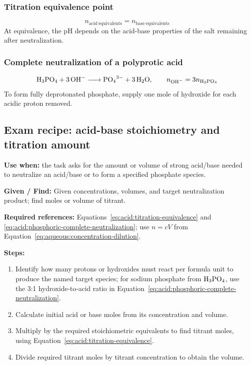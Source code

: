 \subsubsection{Titration equivalence point}
\begin{equation}
n_{\mathrm{acid\ equivalents}}=n_{\mathrm{base\ equivalents}}
\label{eq:acid:titration-equivalence}
\end{equation}
At equivalence, the pH depends on the acid-base properties of the salt remaining after neutralization.

\subsubsection{Complete neutralization of a polyprotic acid}
\begin{equation}
\ce{H3PO4 + 3OH- -> PO4^3- + 3H2O}, \qquad
n_{\ce{OH-}}=3n_{\ce{H3PO4}}
\label{eq:acid:phosphoric-complete-neutralization}
\end{equation}
To form fully deprotonated phosphate, supply one mole of hydroxide for each acidic proton removed.

\subsection{Exam recipe: acid-base stoichiometry and titration amount}
\textbf{Use when:} the task asks for the amount or volume of strong acid/base needed to neutralize an acid/base or to form a specified phosphate species.

\textbf{Given / Find:} Given concentrations, volumes, and target neutralization product; find moles or volume of titrant.

\textbf{Required references:} Equations~\eqref{eq:acid:titration-equivalence} and \eqref{eq:acid:phosphoric-complete-neutralization}; use \(n=cV\) from Equation~\eqref{eq:aqueous:concentration-dilution}.

\textbf{Steps:}
\begin{enumerate}
    \item Identify how many protons or hydroxides must react per formula unit to produce the named target species; for sodium phosphate from \(\ce{H3PO4}\), use the 3:1 hydroxide-to-acid ratio in Equation~\eqref{eq:acid:phosphoric-complete-neutralization}.
    \item Calculate initial acid or base moles from its concentration and volume.
    \item Multiply by the required stoichiometric equivalents to find titrant moles, using Equation~\eqref{eq:acid:titration-equivalence}.
    \item Divide required titrant moles by titrant concentration to obtain the volume.
\end{enumerate}

